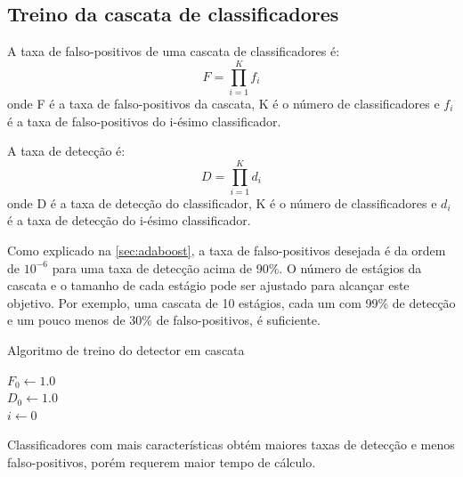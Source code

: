 \subsection{Treino da cascata de classificadores}

A taxa de falso-positivos de uma cascata de classificadores é:
%
\begin{equation} \label{eq:tax_falso_positivos}
F = \prod_{i=1}^{K} f_{i}
\end{equation}
%
onde F é a taxa de falso-positivos da cascata, K é o número de classificadores e $f_{i}$ é a taxa de falso-positivos do i-ésimo classificador.

A taxa de detecção é:
%
\begin{equation} \label{eq:taxa_deteccao}
D = \prod_{i=1}^{K} d_{i}
\end{equation}
%
onde D é a taxa de detecção do classificador, K é o número de classificadores e $d_{i}$ é a taxa de detecção do i-ésimo classificador.

Como explicado na \autoref{sec:adaboost}, a taxa de falso-positivos desejada é da ordem de $10^{-6}$ para uma taxa de detecção acima de 90\%.
O número de estágios da cascata e o tamanho de cada estágio pode ser ajustado para alcançar este objetivo.
Por exemplo, uma cascata de 10 estágios, cada um com 99\% de detecção e um pouco menos de 30\% de falso-positivos, é suficiente.

\begin{algorithm}[htbp]
\caption{Algoritmo de treino do detector em cascata}
\label{alg:train_cascade}
\SetAlgoLined
\LinesNumbered
{}
\BlankLine
$F_{0} \leftarrow 1.0$\\
$D_{0} \leftarrow 1.0$\\
$i \leftarrow 0$
\end{algorithm}

Classificadores com mais características obtém maiores taxas de detecção e menos falso-positivos, porém requerem maior tempo de cálculo.